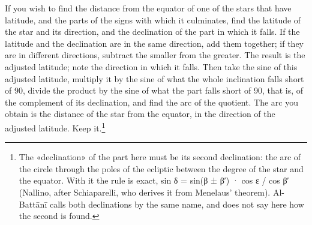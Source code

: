 \documentclass[11pt]{article}
\begin{document}
\par If you wish to find the distance from the equator of one of the stars that have latitude, and the parts of the signs with which it culminates, find the latitude of the star and its direction, and the declination of the part in which it falls. If the latitude and the declination are in the same direction, add them together; if they are in different directions, subtract the smaller from the greater. The result is the adjusted latitude; note the direction in which it falls. Then take the sine of this adjusted latitude, multiply it by the sine of what the whole inclination falls short of 90, divide the product by the sine of what the part falls short of 90, that is, of the complement of its declination, and find the arc of the quotient. The arc you obtain is the distance of the star from the equator, in the direction of the adjusted latitude. Keep it.\footnote{The «declination» of the part here must be its second declination: the arc of the circle through the poles of the ecliptic between the degree of the star and the equator. With it the rule is exact, sin δ = sin(β ± β′) · cos ε / cos β′ (Nallino, after Schiaparelli, who derives it from Menelaus' theorem). Al-Battānī calls both declinations by the same name, and does not say here how the second is found.}\par
\end{document}
